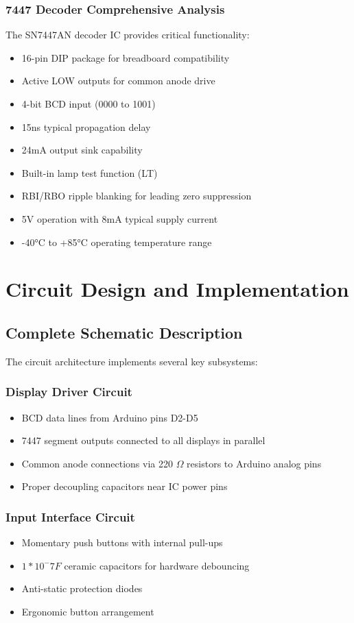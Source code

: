 \documentclass[a4paper,12pt]{article}
\begin{document}
\subsubsection{7447 Decoder Comprehensive Analysis}
The SN7447AN decoder IC provides critical functionality:
\begin{itemize}
    \item 16-pin DIP package for breadboard compatibility
    \item Active LOW outputs for common anode drive
    \item 4-bit BCD input (0000 to 1001)
    \item 15ns typical propagation delay
    \item 24mA output sink capability
    \item Built-in lamp test function (LT)
    \item RBI/RBO ripple blanking for leading zero suppression
    \item 5V operation with 8mA typical supply current
    \item -40°C to +85°C operating temperature range
\end{itemize}

\section{Circuit Design and Implementation}

\subsection{Complete Schematic Description}
The circuit architecture implements several key subsystems:

\subsubsection{Display Driver Circuit}
\begin{itemize}
    \item BCD data lines from Arduino pins D2-D5
    \item 7447 segment outputs connected to all displays in parallel
    \item Common anode connections via 220 $\Omega$ resistors to Arduino analog pins
    \item Proper decoupling capacitors near IC power pins
\end{itemize}

\subsubsection{Input Interface Circuit}
\begin{itemize}
    \item Momentary push buttons with internal pull-ups
    \item $1 * 10^-7 F$ ceramic capacitors for hardware debouncing
    \item Anti-static protection diodes
    \item Ergonomic button arrangement
\end{itemize}
\end{document}
